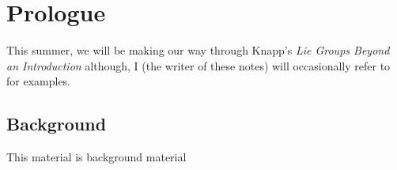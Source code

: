 \chapter{Prologue}
This summer, we will be making our way through Knapp's \emph{Lie Groups
  Beyond an Introduction} \cite{knapp} although, I (the writer of these
notes) will occasionally refer to \cite{hall} for examples.

\section{Background}
This material is background material

